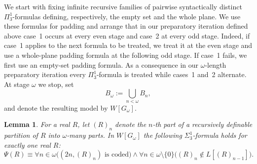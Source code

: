 \documentclass[a4paper,11pt]{article}
\newtheorem{lemma}[theorem]{Lemma}
\begin{document}
We start with fixing infinite recursive families of pairwise syntactically distinct $\Pi^1_3$-formulas defining, respectively, the empty set and the whole plane. We use these formulas for padding and arrange that in our preparatory iteration defined above case~1 occurs at every even stage and case~2 at every odd stage. Indeed, if case~1 applies to the next formula to be treated, we treat it at the even stage and use a whole-plane padding formula at the following odd stage. If case~1 fails, we first use an empty-set padding formula. As a consequence in our $\omega$-length preparatory iteration every $\Pi^1_3$-formula is treated while cases~1 and~2 alternate.
At stage $\omega$ we stop, set
\[
B_\omega:=\bigcup_{n<\omega}B_n,
\]
and denote the resulting model by $W[G_\omega]$.


\begin{lemma}\label{DefinabilityR}
For a real $R$, let $(R)_n$ denote the $n$-th part of a recursively definable partition of $R$ into $\omega$-many parts. In $W[G_\omega]$ the following $\Sigma^1_3$-formula holds for exactly one real $R$:
\[
\Psi(R)\equiv
\forall n\in\omega\bigl((2n,(R)_n)\text{ is coded}\bigr)
\land
\forall n\in\omega\setminus\{0\}\bigl((R)_n\notin L[(R)_{n-1}]\bigr).
\]
\end{lemma}
\end{document}
